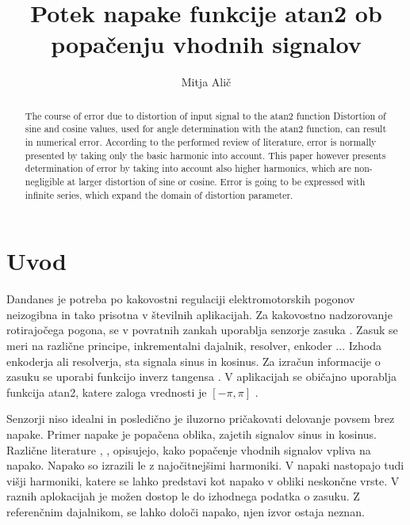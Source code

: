 \documentclass[a4paper]{article}
\begin{document}
\title{Potek napake funkcije atan2 ob popačenju vhodnih signalov}

\author{Mitja Alič} %



\maketitle


\begin{abstract}{The course of error due to distortion of input signal to the atan2 function}
Distortion of sine and cosine values, used for angle determination with the atan2 function, can result in numerical error. According to the performed review of literature, error is normally presented by taking only the basic harmonic into account. This paper however presents determination of error by taking into account also higher harmonics, which are non-negligible at larger distortion of sine or cosine. Error is going to be expressed with infinite series, which expand the domain of distortion parameter. 
\end{abstract}



\section{Uvod}

Dandanes je potreba po kakovostni regulaciji elektromotorskih pogonov neizogibna in tako prisotna v številnih aplikacijah. Za kakovostno nadzorovanje rotirajočega pogona, se v povratnih zankah uporablja senzorje zasuka \cite{uporaba_senzorjev}. Zasuk se meri na različne principe, inkrementalni dajalnik, resolver, enkoder \cite{inkrementalni}\cite{resolver}\cite{enkoder}... Izhoda enkoderja ali resolverja, sta signala sinus in kosinus. Za izračun informacije o zasuku se uporabi funkcijo inverz tangensa \cite{mat1}. V aplikacijah se običajno uporablja funkcija atan2, katere zaloga vrednosti je $[-\pi, \pi]$ \cite{atan}. 


Senzorji niso idealni in posledično je iluzorno pričakovati delovanje povsem brez napake. Primer napake je popačena oblika, zajetih signalov sinus in kosinus. Različne literature \cite{RLS1}, \cite{RLS2}, \cite{RLS3} opisujejo, kako popačenje vhodnih signalov vpliva na napako. Napako so izrazili le z najočitnejšimi harmoniki. V napaki nastopajo tudi višji harmoniki, katere se lahko predstavi kot napako v obliki neskončne vrste. V raznih aplokacijah je možen dostop le do izhodnega podatka o zasuku. Z referenčnim dajalnikom, se lahko določi napako, njen izvor ostaja neznan.
\end{document}

